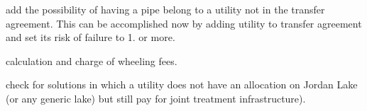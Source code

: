 \begin{DoxyRefList}
add the possibility of having a pipe belong to a utility not in the transfer agreement. This can be accomplished now by adding utility to transfer agreement and set its risk of failure to 1. or more. 

calculation and charge of wheeling fees.  
\item[\label{todo__todo000006}%
\Hypertarget{todo__todo000006}%
Global \mbox{\hyperlink{classTriangle_a9e95039d098fd61cce1a830b85ed7004_a9e95039d098fd61cce1a830b85ed7004}{Triangle\+:\+:function\+Evaluation}} (double $\ast$vars, double $\ast$objs, double $\ast$consts) override]check for solutions in which a utility does not have an allocation on Jordan Lake (or any generic lake) but still pay for joint treatment infrastructure). 
\end{DoxyRefList}